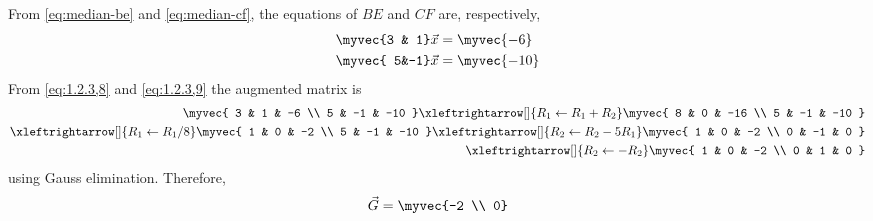 \solution 
From 
	\eqref{eq:median-be}
	and
	\eqref{eq:median-cf},
the equations of $BE$ 
and 
$CF$
are, respectively,
\begin{align}
\myvec{3 & 1} \vec{x} &= \myvec{-6}
\label{eq:1.2.3,8}
\\
\myvec{ 5&-1} \vec{x} &= \myvec{-10}
\label{eq:1.2.3,9}
\end{align}
From \eqref{eq:1.2.3,8} and \eqref{eq:1.2.3,9} the augmented matrix is
\begin{align}
    \label{eq:matrowoperations}
    \myvec{
    3 & 1 & -6
    \\
    5 & -1 & -10
    }
     \xleftrightarrow[]{R_1 \leftarrow R_1+R_2}
    \myvec{
    8 & 0 & -16
    \\
    5 & -1 & -10 
    }
    \\
     \xleftrightarrow[]{R_1\leftarrow R_1/8}
    \myvec{
    1 & 0 & -2
    \\
    5 & -1 & -10 
    }
     \xleftrightarrow[]{R_2\leftarrow R_2-5R_1}
    \myvec{
    1 & 0 & -2
    \\
    0 & -1 & 0
    }
    \\
     \xleftrightarrow[]{R_2\leftarrow -R_2}
    \myvec{
    1 & 0 & -2
    \\
    0 & 1 & 0
    }
\end{align} 
using Gauss elimination.  Therefore, 
\begin{align}
\vec{G} = \myvec{-2 \\ 0}
	\label{eq:median-g}
\end{align}
